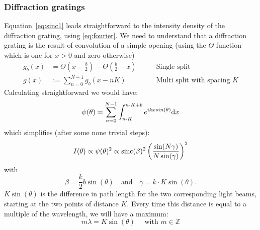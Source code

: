 \subsubsection{Diffraction gratings}
Equation~\eqref{eq:sinc1} leads straightforward to the intensity density of
the diffraction grating, using \eqref{eq:fourier}. We need to understand 
that a diffraction grating is the result of convolution of a simple opening
(using the $\Theta$ function which is one for $x>0$ and zero otherwise)
\begin{align}
    \label{eq:multisplit}
    g_b(x) &= \Theta(x - \frac{b}{2}) - \Theta( \frac{b}{2} - x ) \qquad
           &\text{Single split} \\ 
   g(x)   &:= \sum_{n=0}^{N-1} g_b(x-nK) 
         \qquad &\text{Multi split with spacing } K
\end{align}
Calculating straightforward we would have:
\begin{equation}
    \psi(\theta) = \sum_{n = 0}^{N-1}  \int^{n \cdot K + b}_{n \cdot K} e^{i k x sin(\theta)} \mathrm{d} x
\end{equation}
which simplifies (after some none trivial steps):
\begin{equation}
    I(\theta) \propto \psi(\theta)^2 \propto \mathrm{sinc}(\beta)^2 \left (\frac{\sin(N\gamma)}{N \sin(\gamma)}\right )^2
\end{equation}
with
\begin{equation}
    \beta = \frac{k}{2}b \sin(\theta) \quad \text{and} \quad \gamma = k\cdot K \sin(\theta).
\end{equation}
$K \sin (\theta)$ is the difference in path length for the two corresponding light beams, 
starting at the two points of distance $K$. Every time
this distance is equal to a multiple of the wavelength, we will have a maximum:
\begin{equation}
    m \lambda = K \sin(\theta) \quad \text{ with }m \in \mathbb{Z}
    \label{eq:N_lines_interference}
\end{equation}

